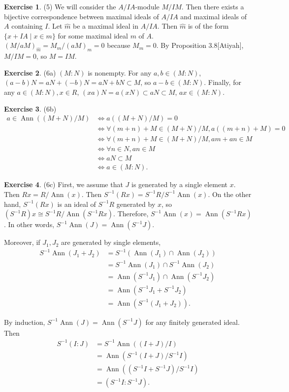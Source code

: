 \documentclass[12pt, psamsfonts]{amsart}
\theoremstyle{definition}
\newtheorem*{exer}{Exercise}
\theoremstyle{remark}
\DeclareMathOperator{\Ann}{Ann}
\numberwithin{equation}{section}
\begin{document}
\begin{exer}{(5)}
  We will consider the $A / IA$-module $M / IM$.
  Then there exists a bijective correspondence between maximal ideals of $A / IA$ and maximal ideals of $A$ containing $I$.
  Let $\hat{m}$ be a maximal ideal in $A / IA$.
  Then $\hat{m}$ is of the form $\{ x + IA \mid x \in m \}$ for some maximal ideal $m$ of $A$.
  $(M / aM)_{\hat{m}} = M_m / (aM)_m = 0$ because $M_m = 0$.
  By Proposition 3.8[Atiyah], $M / IM = 0$, so $M = IM$.
\end{exer}

\begin{exer}{(6a)}
  $(M:N)$ is nonempty.
  For any $a, b \in (M:N)$, $(a - b)N = aN + (-b)N = aN + bN \subset M$, so $a - b \in (M:N)$.
  Finally, for any $a \in (M:N), x \in R$, $(xa)N = a(xN) \subset aN \subset M$, $ax \in (M:N)$.
\end{exer}

\begin{exer}{(6b)}
  $ $
  \begin{align*}
    a \in \Ann((M + N) / M)
      &\iff a((M + N) / M) = 0 \\
      &\iff \forall (m + n) + M \in (M + N) / M, a((m + n) + M) = 0 \\
      &\iff \forall (m + n) + M \in (M + N) / M, am + an \in M \\
      &\iff \forall n \in N, an \in M \\
      &\iff aN \subset M \\
      &\iff a \in (M:N).
  \end{align*}
\end{exer}

\begin{exer}{(6c)}
  First, we assume that $J$ is generated by a single element $x$.
  Then $Rx = R / \Ann(x)$.
  Then $S^{-1}(Rx) = S^{-1}R / S^{-1}\Ann(x)$.
  On the other hand, $S^{-1}(Rx)$ is an ideal of $S^{-1}R$ generated by $x$, so $(S^{-1}R)x \cong S^{-1}R / \Ann(S^{-1}Rx)$.
  Therefore, $S^{-1}\Ann(x) = \Ann(S^{-1}Rx)$.
  In other words, $S^{-1}\Ann(J) = \Ann(S^{-1}J)$.

  Moreover, if $J_1, J_2$ are generated by single elements, 
  \begin{align*}
    S^{-1}\Ann(J_1 + J_2)
      &= S^{-1}(\Ann(J_1) \cap \Ann(J_2)) \\
      &= S^{-1}\Ann(J_1) \cap S^{-1}\Ann(J_2) \\
      &= \Ann(S^{-1}J_1) \cap \Ann(S^{-1}J_2) \\
      &= \Ann(S^{-1}J_1 + S^{-1}J_2) \\
      &= \Ann(S^{-1}(J_1 + J_2)).
  \end{align*}

  By induction, $S^{-1}\Ann(J) = \Ann(S^{-1}J)$ for any finitely generated ideal.
  Then 
  \begin{align*}
    S^{-1}(I:J)
      &= S^{-1}\Ann((I + J) / I) \\
      &= \Ann(S^{-1}(I + J) / S^{-1}I) \\
      &= \Ann((S^{-1}I + S^{-1}J) / S^{-1}I) \\
      &= (S^{-1}I:S^{-1}J).
  \end{align*}
\end{exer}
\end{document}
